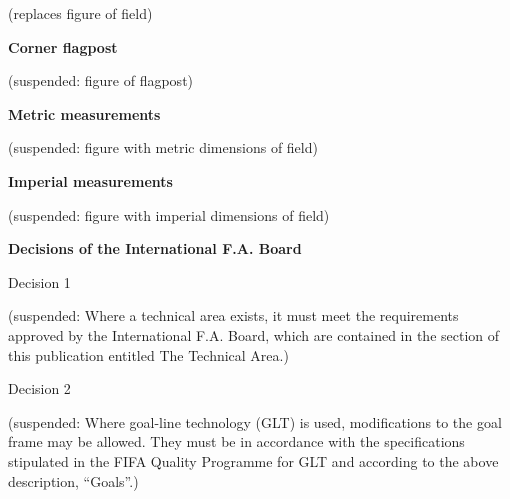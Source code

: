 {\color[rgb]{0.4,0.4,0.4}
(replaces figure of field)}

\bigskip

{\bfseries Corner flagpost}

\headlinebox 

\textcolor[rgb]{0.4,0.4,0.4}{(suspended: figure of flagpost)}

\bigskip

{\bfseries Metric measurements}

\headlinebox 

\textcolor[rgb]{0.4,0.4,0.4}{(suspended: figure with metric dimensions of field)}

\bigskip

{\bfseries Imperial measurements}

\headlinebox 

\textcolor[rgb]{0.4,0.4,0.4}{(suspended: figure with imperial dimensions of field)}

\clearpage

{\bfseries Decisions of the International F.A. Board}

\headlinebox 

Decision 1

{\color[rgb]{0.4,0.4,0.4}
(suspended: Where a technical area exists, it must meet the requirements approved by the International F.A. Board, which are contained in the section of this publication entitled The Technical Area.)}

\bigskip

Decision 2

{\color[rgb]{0.4,0.4,0.4}
(suspended: Where goal-line technology (GLT) is used, modifications to the goal frame may be allowed. They must be in accordance with the specifications stipulated in the FIFA Quality Programme for GLT and according to the above description, ``Goals''.) }
